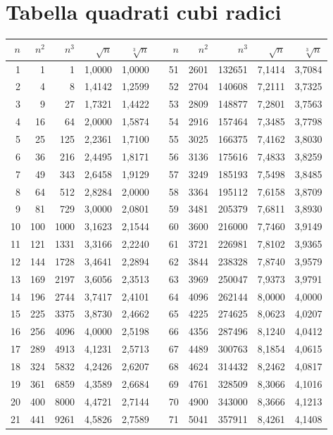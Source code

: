 
\section{Tabella quadrati cubi radici}
\label{sec:Tabellaquadraticubiradici}
\begin{longtable}{rrrrrrrrrrr} 
	\toprule
	\bfseries $n$ &  $n^2$ & $n^3$&$\sqrt{n}$&$\sqrt[3]{n}$& &$n$ &  $n^2$ & $n^3$&$\sqrt{n}$&$\sqrt[3]{n}$  \\
	\midrule \endhead
	\bottomrule \endfoot\index{Tabella!quadrati}\index{Tabella!cubi}\index{Tabella!radici}
1&1&1&1,0000&1,0000&&51&2601&132651&7,1414&3,7084\\
2&4&8&1,4142&1,2599&&52&2704&140608&7,2111&3,7325\\
3&9&27&1,7321&1,4422&&53&2809&148877&7,2801&3,7563\\
4&16&64&2,0000&1,5874&&54&2916&157464&7,3485&3,7798\\
5&25&125&2,2361&1,7100&&55&3025&166375&7,4162&3,8030\\
6&36&216&2,4495&1,8171&&56&3136&175616&7,4833&3,8259\\
7&49&343&2,6458&1,9129&&57&3249&185193&7,5498&3,8485\\
8&64&512&2,8284&2,0000&&58&3364&195112&7,6158&3,8709\\
9&81&729&3,0000&2,0801&&59&3481&205379&7,6811&3,8930\\
10&100&1000&3,1623&2,1544&&60&3600&216000&7,7460&3,9149\\
11&121&1331&3,3166&2,2240&&61&3721&226981&7,8102&3,9365\\
12&144&1728&3,4641&2,2894&&62&3844&238328&7,8740&3,9579\\
13&169&2197&3,6056&2,3513&&63&3969&250047&7,9373&3,9791\\
14&196&2744&3,7417&2,4101&&64&4096&262144&8,0000&4,0000\\
15&225&3375&3,8730&2,4662&&65&4225&274625&8,0623&4,0207\\
16&256&4096&4,0000&2,5198&&66&4356&287496&8,1240&4,0412\\
17&289&4913&4,1231&2,5713&&67&4489&300763&8,1854&4,0615\\
18&324&5832&4,2426&2,6207&&68&4624&314432&8,2462&4,0817\\
19&361&6859&4,3589&2,6684&&69&4761&328509&8,3066&4,1016\\
20&400&8000&4,4721&2,7144&&70&4900&343000&8,3666&4,1213\\
21&441&9261&4,5826&2,7589&&71&5041&357911&8,4261&4,1408\\

\end{longtable}
